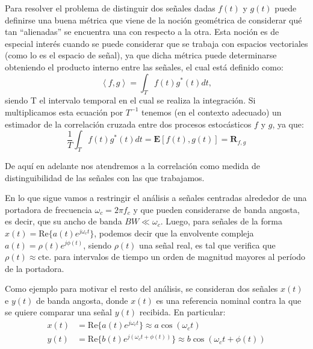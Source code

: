 Para resolver el problema de distinguir dos señales dadas $f(t)$ y $g(t)$ puede definirse una buena métrica que viene de la noción geométrica de considerar qué tan ``alienadas'' se encuentra una con respecto a la otra. Esta noción es de especial interés cuando se puede considerar que se trabaja con espacios vectoriales (como lo es el espacio de señal), ya que dicha métrica puede determinarse obteniendo el producto interno entre las señales, el cual está definido como:
\begin{equation}
    \left \langle f,g \right \rangle = \int_{T} f(t) g^*(t)dt,
    \label{eq:rs_prodint}
\end{equation}
siendo T el intervalo temporal en el cual se realiza la integración. Si multiplicamos esta ecuación por $T^{-1}$ tenemos (en el contexto adecuado) un estimador de la correlación cruzada entre dos procesos estocásticos $f$ y $g$, ya que:
\begin{equation}
    \frac{1}{T} \int_{T} f(t) g^*(t)dt = \mathbf{E}[f(t),g(t)]=\mathbf{R}_{f,g}
\end{equation}

De aquí en adelante nos atendremos a la correlación como medida de distinguibilidad de las señales con las que trabajamos.

En lo que sigue vamos a restringir el análisis a señales centradas alrededor de una portadora de frecuencia $\omega_c=2\pi f_c$ y que pueden considerarse de banda angosta, es decir, que su ancho de banda $BW \ll \omega_c$. Luego, para señales de la forma $x(t) = \mathrm{Re}\{a(t) e^{j \omega_c t} \}$, podemos decir que la envolvente compleja $a(t)= \rho(t) e^{j \phi(t)}$, siendo $\rho(t)$ una señal real, es tal que verifica que $\rho(t) \approx \mathrm{cte.}$ para intervalos de tiempo un orden de magnitud mayores al período de la portadora.

Como ejemplo para motivar el resto del análisis, se consideran dos señales $x(t)$ e $y(t)$ de banda angosta, donde $x(t)$ es una referencia nominal contra la que se quiere comparar una señal $y(t)$ recibida. En particular:
\begin{equation}
    \begin{split}
        x(t) & =\mathrm{Re} \{ a(t) e^{j\omega_c t} \} \approx a \cos (\omega_c t)                    \\
        y(t) & =\mathrm{Re} \{ b(t) e^{j(\omega_c t +\phi (t))} \} \approx b \cos (\omega_c t +\phi(t))
    \end{split}
\end{equation}

